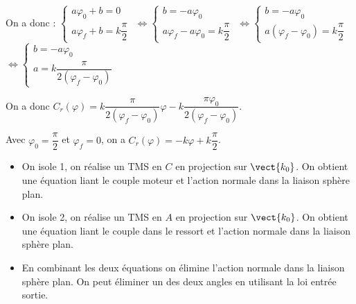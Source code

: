 On a donc : 
$\left\{\begin{array}{l} 
a\varphi_0 + b = 0 \\
a\varphi_f + b = k \dfrac{\pi}{2}
\end{array}
\right. $
$\Leftrightarrow 
\left\{\begin{array}{l} 
 b = -a\varphi_0 \\
a\varphi_f  -a\varphi_0= k \dfrac{\pi}{2}
\end{array}
\right. $
$\Leftrightarrow 
\left\{\begin{array}{l} 
 b = -a\varphi_0 \\
a\left(\varphi_f  -\varphi_0\right)= k \dfrac{\pi}{2}
\end{array}
\right. $
$\Leftrightarrow 
\left\{\begin{array}{l} 
 b = -a\varphi_0 \\
a= k \dfrac{\pi}{2 \left(\varphi_f  -\varphi_0\right)}
\end{array}
\right. $

On a donc $C_r(\varphi)= k \dfrac{\pi}{2 \left(\varphi_f  -\varphi_0\right)}\varphi - k \dfrac{\pi \varphi_0}{2 \left(\varphi_f  -\varphi_0\right)} $.

Avec $\varphi_0=\dfrac{\pi}{2}$ et $\varphi_f=0$, on a 
$C_r(\varphi)= -k \varphi + k \dfrac{\pi}{2} $.


%
%
%


\else
\fi

\ifprof
\begin{itemize}
\item On isole 1, on réalise un TMS en $C$ en projection sur $\vect{k_0}$. On obtient une équation liant le couple moteur et l'action normale dans la liaison sphère plan. 
\item On isole 2, on réalise un TMS en $A$ en projection sur $\vect{k_0}$. On obtient une équation liant le couple dans le ressort et l'action normale dans la liaison sphère plan. 
\item En combinant les deux équations on élimine l'action normale dans la liaison sphère plan. On peut éliminer un des deux angles en utilisant la loi entrée sortie.
\end{itemize}
\else
\fi


